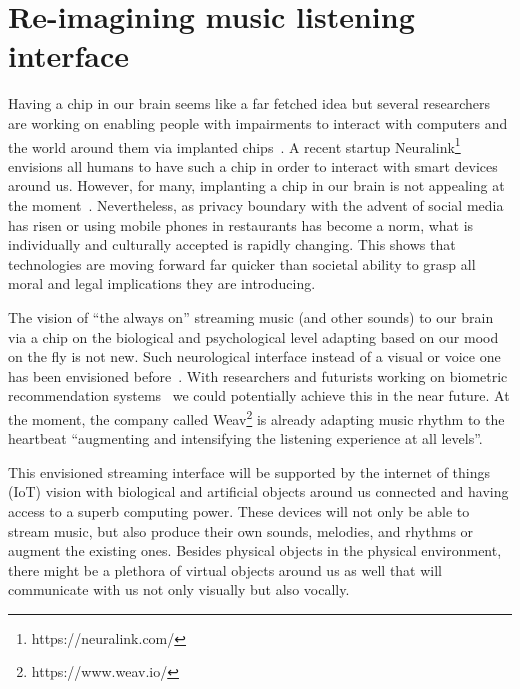 \documentclass[sigchi]{acmart}
\begin{document}
\section{Re-imagining music listening interface}


Having a chip in our brain seems like a far fetched idea but several researchers are working on enabling people with impairments to interact with computers and the world around them via implanted chips~\cite{santhanam2006high}. A recent startup Neuralink\footnote{https://neuralink.com/} envisions all humans to have such a chip in order to interact with smart devices around us. However, for many, implanting a chip in our brain is not appealing at the moment~\cite{metz2019chipbrain}. Nevertheless, as privacy boundary with the advent of social media has risen or using mobile phones in restaurants has become a norm, what is individually and culturally accepted is rapidly changing. This shows that technologies are moving forward far quicker than societal ability to grasp all moral and legal implications they are introducing.

The vision of ``the always on'' streaming music (and other sounds) to our brain via a chip on the biological and psychological level adapting based on our mood on the fly is not new. Such neurological interface instead of a visual or voice one has been envisioned before~\cite{cherie2019bravenewworld}. With researchers and futurists working on biometric recommendation systems~\cite{zhang2018system} we could potentially achieve this in the near future. At the moment, the company called Weav\footnote{https://www.weav.io/} is already adapting music rhythm to the heartbeat ``augmenting and intensifying the listening experience at all levels''. 

This envisioned streaming interface will be supported by the internet of things (IoT) vision with biological and artificial objects around us connected \cite{weisman2004internet} and having access to a superb computing power. These devices will not only be able to stream music, but also produce their own sounds, melodies, and rhythms or augment the existing ones. Besides physical objects in the physical environment, there might be a plethora of virtual objects around us as well that will communicate with us not only visually but also vocally.
\end{document}
